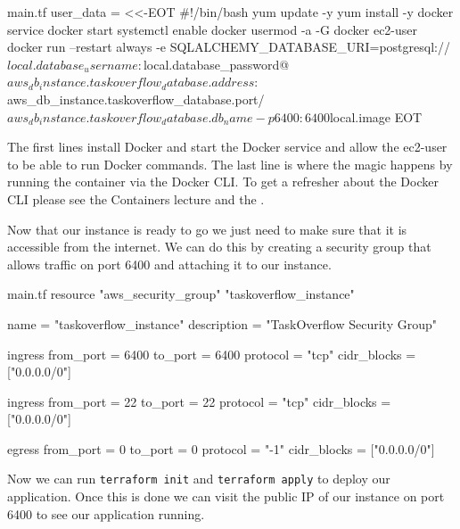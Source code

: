 \documentclass{csse4400}
\begin{document}

\begin{code}[language=terraform,numbers=none]{main.tf}
  user_data = <<-EOT
#!/bin/bash
yum update -y
yum install -y docker
service docker start
systemctl enable docker
usermod -a -G docker ec2-user 
docker run --restart always -e SQLALCHEMY_DATABASE_URI=postgresql://${local.database_username}:${local.database_password}@${aws_db_instance.taskoverflow_database.address}:${aws_db_instance.taskoverflow_database.port}/${aws_db_instance.taskoverflow_database.db_name} -p 6400:6400 ${local.image}
  EOT
\end{code}

The first lines install Docker and start the Docker service and allow the ec2-user to be able to run Docker commands.
The last line is where the magic happens by running the container via the Docker CLI.
To get a refresher about the Docker CLI please see the Containers lecture \cite{container-slides} and the . 


Now that our instance is ready to go we just need to make sure that it is accessible from the internet.
We can do this by creating a security group that allows traffic on port 6400 and attaching it to our instance.

\begin{code}[language=terraform,numbers=none]{main.tf}
resource "aws_security_group" "taskoverflow_instance" {
    name = "taskoverflow_instance"
    description = "TaskOverflow Security Group"
  
    ingress {
      from_port = 6400
      to_port = 6400
      protocol = "tcp"
      cidr_blocks = ["0.0.0.0/0"]
    }
  
    ingress {
      from_port = 22
      to_port = 22
      protocol = "tcp"
      cidr_blocks = ["0.0.0.0/0"]
    }
  
    egress {
      from_port = 0
      to_port = 0
      protocol = "-1"
      cidr_blocks = ["0.0.0.0/0"]
    }
}
\end{code}

Now we can run \texttt{terraform init} and \texttt{terraform apply} to deploy our application.
Once this is done we can visit the public IP of our instance on port 6400 to see our application running.
\end{document}
